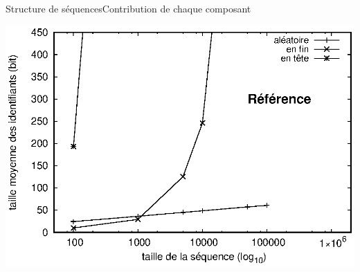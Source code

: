 \begin{frame}{Structure de séquences}{Contribution de chaque composant}
  
  \hspace{-1cm}
  \begin{minipage}{0.45\textwidth}
    \includegraphics[width=1.25\textwidth]{img/replication/logoot.eps}
  \end{minipage}
  \hspace{1.5cm}
  \begin{minipage}{0.45\textwidth}
  \end{minipage}
  

\end{frame}
